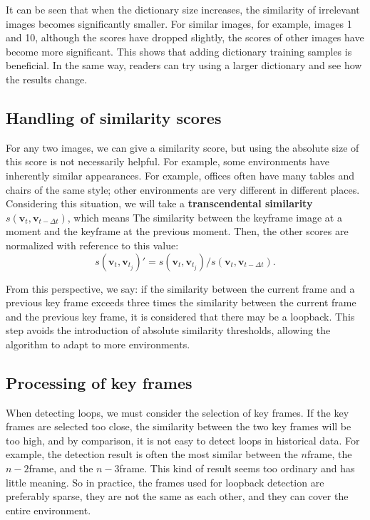 It can be seen that when the dictionary size increases, the similarity of irrelevant images becomes significantly smaller. For similar images, for example, images 1 and 10, although the scores have dropped slightly, the scores of other images have become more significant. This shows that adding dictionary training samples is beneficial. In the same way, readers can try using a larger dictionary and see how the results change.

\subsection{Handling of similarity scores}
For any two images, we can give a similarity score, but using the absolute size of this score is not necessarily helpful. For example, some environments have inherently similar appearances. For example, offices often have many tables and chairs of the same style; other environments are very different in different places. Considering this situation, we will take a \textbf{transcendental similarity} $s \left (\bm{v} _t, \bm{v} _{t- \Delta t} \right) $, which means The similarity between the keyframe image at a moment and the keyframe at the previous moment. Then, the other scores are normalized with reference to this value:
\begin{equation}
s\left( \bm{v}_t, \bm{v}_{t_j}\right)' = s\left( \bm{v}_t, \bm{v}_{t_j}\right)/s\left( \bm{v}_t, \bm{v}_{t-\Delta t}\right).
\end{equation}

From this perspective, we say: if the similarity between the current frame and a previous key frame exceeds three times the similarity between the current frame and the previous key frame, it is considered that there may be a loopback. This step avoids the introduction of absolute similarity thresholds, allowing the algorithm to adapt to more environments.
\enlargethispage{-5pt}
\subsection{Processing of key frames}
When detecting loops, we must consider the selection of key frames. If the key frames are selected too close, the similarity between the two key frames will be too high, and by comparison, it is not easy to detect loops in historical data. For example, the detection result is often the most similar between the $n $frame, the $n-2 $frame, and the $n-3 $frame. This kind of result seems too ordinary and has little meaning. So in practice, the frames used for loopback detection are preferably sparse, they are not the same as each other, and they can cover the entire environment.

